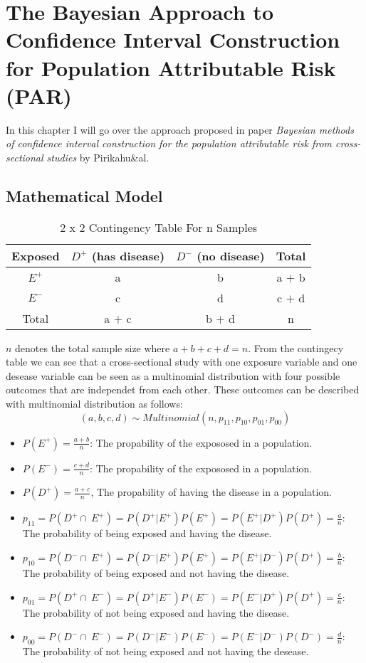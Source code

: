 \chapter{The Bayesian Approach to Confidence Interval Construction for Population Attributable Risk (PAR)} \label{bayesian-model}
In this chapter I will go over the approach proposed in paper \textit{Bayesian methods of confidence interval construction for the population attributable risk from cross-sectional studies} by Pirikahu\&al. 

\section{Mathematical Model} \label{PiriMath}
\begin{table}[h!]
\centering
\caption{2 x 2 Contingency Table For n Samples}
\label{contingency-table}
\begin{tabular}{|c|c|c|c|}
\hline
Exposed & $D^+$ (has disease) & $D^-$ (no disease) & Total \\ \hline
$E^+$ & a & b & a $+$ b \\ \hline
$E^-$ & c & d & c $+$ d \\ \hline
Total & a $+$ c & b $+$ d & n \\ \hline
\end{tabular}
\end{table}

$n$ denotes the total sample size where $a + b + c + d = n$. From the contingecy table we can see that a cross-sectional study with one exposure variable and one desease variable can be seen as a multinomial distribution with four possible outcomes that are independet from each other. These outcomes can be described with multinomial distribution as follows:
\begin{equation} \label{multinomial}
(a, b, c, d) \sim Multinomial(n, p_{11}, p_{10}, p_{01}, p_{00})
\end{equation}

\begin{itemize}
    \item $P(E^+) = \frac{a + b}{n}$: The propability of the expososed in a population.
    \item $P(E^-) = \frac{c + d}{n}$: The propability of the expososed in a population.
    \item $P(D^+) = \frac{a + c}{n}$, The propability of having the disease in a population.
    \item $p_{11} = P(D^+ \cap\ E^+) = P(D^+ | E^+)P(E^+) = P(E^+ | D^+)P(D^+) = \frac{a}{n}$: The probability of being exposed and having the disease.
    \item $p_{10} = P(D^- \cap\ E^+) = P(D^- | E^+)P(E^+) = P(E^+ | D^-)P(D^+) = \frac{b}{n}$: The probability of being exposed and not having the disease.
    \item $p_{01} = P(D^+ \cap\ E^-) = P(D^+ | E^-)P(E^-) = P(E^- | D^+)P(D^+) = \frac{c}{n}$: The probability of not being exposed and having the disease.
    \item $p_{00} = P(D^- \cap\ E^-) = P(D^- | E^-)P(E^-) = P(E^- | D^-)P(D^-) = \frac{d}{n}$: The probability of not being exposed and not having the desease.
\end{itemize}

